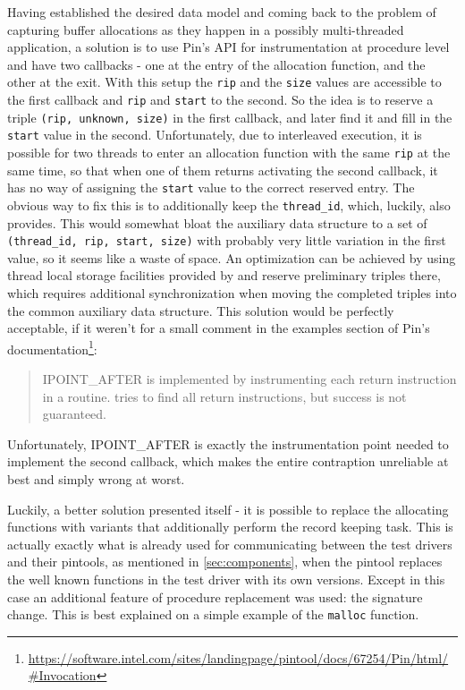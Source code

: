 Having established the desired data model and coming back to the problem of capturing buffer allocations as they
happen in a possibly multi-threaded application, a solution is to use {\small Pin's} API for instrumentation
at procedure level and have two callbacks - one at the entry of the allocation function, and the other at the
exit. With this setup the \texttt{rip} and the \texttt{size} values are accessible to the first callback and
\texttt{rip} and \texttt{start} to the second. So the idea is to reserve a triple \texttt{(rip, unknown, size)}
in the first callback, and later find it and fill in the \texttt{start} value in the second. Unfortunately, due
to interleaved execution, it is possible for two threads to enter an allocation function with the same
\texttt{rip} at the same time, so that when one of them returns activating the second callback, it has no way
of assigning the \texttt{start} value to the correct reserved entry. The obvious way to fix this is to
additionally keep the \texttt{thread\_id}, which, luckily, \pin also provides. This would somewhat bloat the
auxiliary data structure to a set of \texttt{(thread\_id, rip, start, size)} with probably very little
variation in the first value, so it seems like a waste of space. An optimization can be achieved by using
thread local storage facilities provided by \pin and reserve preliminary triples there, which requires
additional synchronization when moving the completed triples into the common auxiliary data structure. This
solution would be perfectly acceptable, if it weren't for a small comment in the examples section of {\small
Pin's}
documentation\footnote{\url{https://software.intel.com/sites/landingpage/pintool/docs/67254/Pin/html/\#Invocation}}:
\begin{quote}
{\small IPOINT\_AFTER} is implemented by instrumenting each return instruction in a routine. \pin tries to find
all return instructions, but success is not guaranteed.
\end{quote}
Unfortunately, {\small IPOINT\_AFTER} is exactly the instrumentation point needed to implement the second
callback, which makes the entire contraption unreliable at best and simply wrong at worst.

Luckily, a better solution presented itself - it is possible to replace the allocating functions with variants
that additionally perform the record keeping task.
This is actually exactly what is already used for communicating between the test drivers and their pintools, as
mentioned in \cref{sec:components}, when the pintool replaces the well known functions in the test driver with
its own versions. Except in this case an additional feature of procedure replacement was used: the signature
change. This is best explained on a simple example of the \texttt{malloc} function. 

